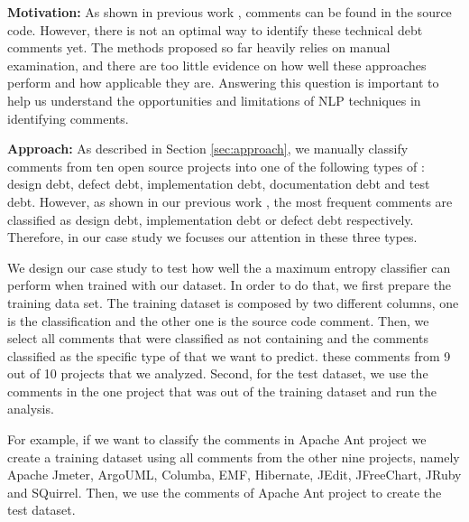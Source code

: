 \vspace{3mm}
\noindent\rqi
\vspace{3mm}

\noindent \textbf{Motivation:} As shown in previous work \cite{Potdar2014ICSME, Maldonado2015MTD}, \SATD comments can be found in the source code. However, there is not an optimal way to identify these technical debt comments yet. The methods proposed so far heavily relies on manual examination, and there are too little evidence on how well these approaches perform and how applicable they are. Answering this question is important to help us understand the opportunities and limitations of NLP techniques in identifying \SATD comments. 

\vspace{1mm}
\noindent \textbf{Approach:} As described in Section \ref{sec:approach}, we manually classify comments from ten open source projects into one of the following types of \SATD: design debt, defect debt, implementation debt, documentation debt and test debt. However, as shown in our previous work \cite{Maldonado2015MTD}, the most frequent \SATD comments are classified as design debt, implementation debt or defect debt respectively. Therefore, in our case study we focuses our attention in these three \SATD types. 

We design our case study to test how well the a maximum entropy classifier can perform when trained with our dataset. In order to do that, we first prepare the training data set. The training dataset is composed by two different columns, one is the classification and the other one is the source code comment. Then, we select all comments that were classified as not containing \SATD and the comments classified as the specific type of \SATD  that we want to predict. these comments from 9 out of 10 projects that we analyzed. Second, for the test dataset, we use the comments in the one project that was out of the training dataset and run the analysis.  

For example, if we want to classify the \SATD comments in Apache Ant project we create a training dataset using all comments from the other nine projects, namely Apache Jmeter, ArgoUML, Columba, EMF, Hibernate, JEdit, JFreeChart, JRuby and SQuirrel. Then, we use the comments of Apache Ant project to create the test dataset. 

